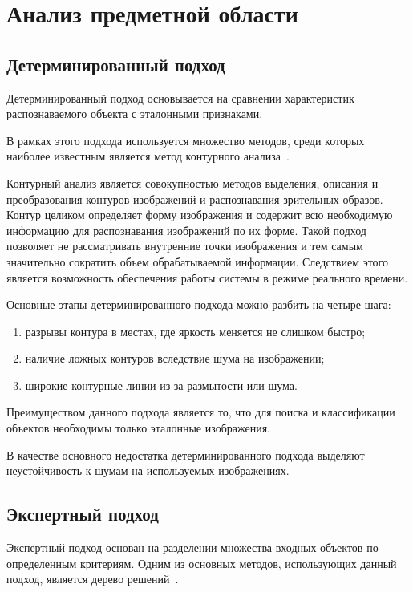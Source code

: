 \chapter{Анализ предметной области}

\section{Детерминированный подход}

Детерминированный подход основывается на сравнении характеристик распознаваемого объекта с эталонными признаками. 

В рамках этого подхода используется множество методов, среди которых наиболее известным является метод контурного анализа~\cite{contur_analysis}.

Контурный анализ является совокупностью методов выделения, описания и преобразования контуров изображений и распознавания зрительных образов. Контур целиком определяет форму изображения и содержит всю необходимую информацию для распознавания изображений по их форме. Такой подход позволяет не рассматривать внутренние точки изображения и тем самым значительно сократить объем обрабатываемой информации. Следствием этого является возможность обеспечения работы системы в режиме реального времени.

Основные этапы детерминированного подхода можно разбить на четыре шага:

\begin{enumerate}
    \item разрывы контура в местах, где яркость меняется не слишком быстро;
    \item наличие ложных контуров вследствие шума на изображении;
    \item широкие контурные линии из-за размытости или шума.
\end{enumerate}

Преимуществом данного подхода является то, что для поиска и классификации объектов необходимы только эталонные изображения.

В качестве основного недостатка детерминированного подхода выделяют неустойчивость к шумам на используемых изображениях.

\clearpage

\section{Экспертный подход}

Экспертный подход основан на разделении множества входных объектов по определенным критериям. Одним из основных методов, использующих данный подход, является дерево решений~\cite{solution_tree}. 

